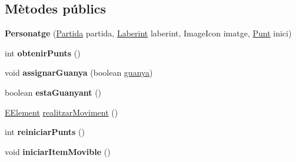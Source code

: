 \subsection*{Mètodes públics}
\begin{DoxyCompactItemize}
\item 
\hypertarget{classlogica_1_1_personatge_af207e20f6a0494a46e710d8c9f33ccff}{{\bfseries Personatge} (\hyperlink{classlogica_1_1_partida}{Partida} partida, \hyperlink{classlogica_1_1laberints_1_1_laberint}{Laberint} laberint, Image\+Icon imatge, \hyperlink{classlogica_1_1_punt}{Punt} inici)}\label{classlogica_1_1_personatge_af207e20f6a0494a46e710d8c9f33ccff}

\item 
\hypertarget{classlogica_1_1_personatge_a9c68a159bb580a73ae28ce692ab5c92d}{int {\bfseries obtenir\+Punts} ()}\label{classlogica_1_1_personatge_a9c68a159bb580a73ae28ce692ab5c92d}

\item 
\hypertarget{classlogica_1_1_personatge_a32871fa2793634b05a0973ceec438560}{void {\bfseries assignar\+Guanya} (boolean \hyperlink{classlogica_1_1_personatge_a0c30dc6ca85f941043ae4a27e7583c67}{guanya})}\label{classlogica_1_1_personatge_a32871fa2793634b05a0973ceec438560}

\item 
\hypertarget{classlogica_1_1_personatge_a45c54c34068a2d0c0ee47c0222c6d6c8}{boolean {\bfseries esta\+Guanyant} ()}\label{classlogica_1_1_personatge_a45c54c34068a2d0c0ee47c0222c6d6c8}

\item 
\hyperlink{enumlogica_1_1enumeracions_1_1_e_element}{E\+Element} \hyperlink{classlogica_1_1_personatge_a39387dbfebd1936e63c29c8a9dd85bb1}{realitzar\+Moviment} ()
\item 
\hypertarget{classlogica_1_1_personatge_afed860920a63cbd1efe126315a7370f4}{int {\bfseries reiniciar\+Punts} ()}\label{classlogica_1_1_personatge_afed860920a63cbd1efe126315a7370f4}

\item 
\hypertarget{classlogica_1_1_personatge_a5f171d79a5a8ca6d0184a250456c44d1}{void {\bfseries iniciar\+Item\+Movible} ()}\label{classlogica_1_1_personatge_a5f171d79a5a8ca6d0184a250456c44d1}

\end{DoxyCompactItemize}
